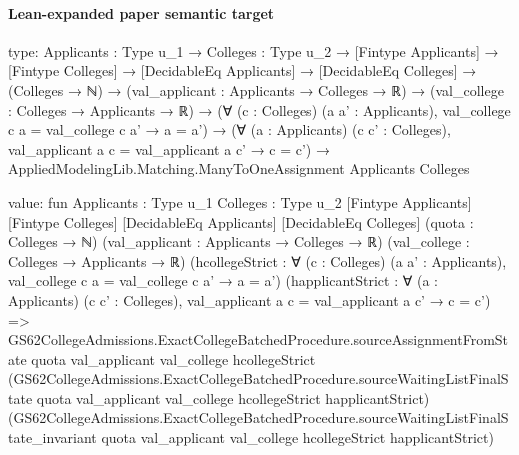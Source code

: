 \documentclass[10pt]{article}
\begin{document}
\paragraph{Lean-expanded paper semantic target}
\begin{ReviewVerbatim}
type:
{Applicants : Type u_1} →
  {Colleges : Type u_2} →
    [Fintype Applicants] →
      [Fintype Colleges] →
        [DecidableEq Applicants] →
          [DecidableEq Colleges] →
            (Colleges → ℕ) →
              (val_applicant : Applicants → Colleges → ℝ) →
                (val_college : Colleges → Applicants → ℝ) →
                  (∀ (c : Colleges) (a a' : Applicants), val_college c a = val_college c a' → a = a') →
                    (∀ (a : Applicants) (c c' : Colleges), val_applicant a c = val_applicant a c' → c = c') →
                      AppliedModelingLib.Matching.ManyToOneAssignment Applicants Colleges

value:
fun {Applicants : Type u_1} {Colleges : Type u_2} [Fintype Applicants] [Fintype Colleges] [DecidableEq Applicants]
    [DecidableEq Colleges] (quota : Colleges → ℕ) (val_applicant : Applicants → Colleges → ℝ)
    (val_college : Colleges → Applicants → ℝ)
    (hcollegeStrict : ∀ (c : Colleges) (a a' : Applicants), val_college c a = val_college c a' → a = a')
    (happlicantStrict : ∀ (a : Applicants) (c c' : Colleges), val_applicant a c = val_applicant a c' → c = c') =>
  GS62CollegeAdmissions.ExactCollegeBatchedProcedure.sourceAssignmentFromState quota val_applicant val_college
    hcollegeStrict
    (GS62CollegeAdmissions.ExactCollegeBatchedProcedure.sourceWaitingListFinalState quota val_applicant val_college
      hcollegeStrict happlicantStrict)
    (GS62CollegeAdmissions.ExactCollegeBatchedProcedure.sourceWaitingListFinalState_invariant quota val_applicant
      val_college hcollegeStrict happlicantStrict)
\end{ReviewVerbatim}
\end{document}
